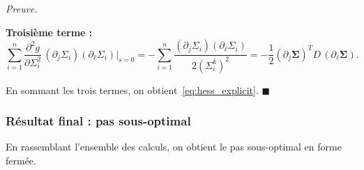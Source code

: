 \documentclass[12pt]{article}
\renewcommand{\qedsymbol}{$\blacksquare$}
\renewenvironment{proof}[1][\proofname]{%
  \par\medskip\noindent
  \textit{\color{proofgray}#1.}\enspace\ignorespaces
}{\hfill\qedsymbol\par\medskip}
\renewcommand{\proofname}{Preuve}
\begin{document}
\begin{proof}
\textbf{Troisième terme :}
\begin{equation*}
\sum_{i=1}^n \frac{\partial^2 g}{\partial\Sigma_i^2}\,(\partial_j\Sigma_i)(\partial_\ell\Sigma_i)\bigg|_{s=0} = -\sum_{i=1}^n\frac{(\partial_j\Sigma_i)(\partial_\ell\Sigma_i)}{2(\Sigma_i^k)^2} = -\frac{1}{2}(\partial_j\boldsymbol{\Sigma})^T D\,(\partial_\ell\boldsymbol{\Sigma}).
\end{equation*}

En sommant les trois termes, on obtient~\eqref{eq:hess_explicit}.
\end{proof}




\subsubsection*{Résultat final : pas sous-optimal}

En rassemblant l'ensemble des calculs, on obtient le pas sous-optimal en forme fermée.
\end{document}
